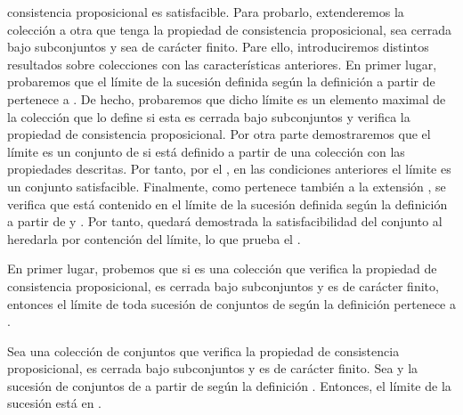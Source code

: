 \begin{isabellebody}
\begin{isamarkuptext}
  consistencia proposicional es satisfacible. Para probarlo, extenderemos la colección  a otra  
  que tenga la propiedad de consistencia proposicional, sea cerrada bajo subconjuntos y sea de 
  carácter finito. Pare ello, introduciremos distintos resultados sobre colecciones  con 
  las características anteriores. En primer lugar, probaremos que el límite de la sucesión definida
  según la definición  a partir de  pertenece a . De hecho, probaremos que 
  dicho límite es un elemento maximal de la colección que lo define si esta es cerrada bajo 
  subconjuntos y verifica la propiedad de consistencia proposicional. Por otra parte demostraremos 
  que el límite es un conjunto de  si está definido a partir de una colección  con las 
  propiedades descritas. Por tanto, por el , en las condiciones anteriores el 
  límite es un conjunto satisfacible. Finalmente, como  pertenece también a la extensión 
  , se verifica que está contenido en el límite de la sucesión definida según la definición 
   a partir de  y . Por tanto, quedará demostrada la satisfacibilidad del 
  conjunto  al heredarla por contención del límite, lo que prueba el .

  En primer lugar, probemos que si  es una colección que verifica la propiedad de 
  consistencia proposicional, es cerrada bajo subconjuntos y es de carácter finito, entonces el 
  límite de toda sucesión de conjuntos de  según la definición  pertenece a .

  \begin{lema}
    Sea  una colección de conjuntos que verifica la propiedad de consistencia proposicional, es 
    cerrada bajo subconjuntos y es de carácter finito. Sea  y  la sucesión de conjuntos
    de  a partir de  según la definición . Entonces, el límite de la sucesión está en
    .
  \end{lema}


\end{isamarkuptext}
\end{isabellebody}
